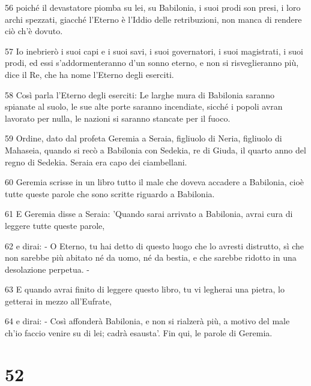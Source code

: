 \par 56 poiché il devastatore piomba su lei, su Babilonia, i suoi prodi son presi, i loro archi spezzati, giacché l'Eterno è l'Iddio delle retribuzioni, non manca di rendere ciò ch'è dovuto.
\par 57 Io inebrierò i suoi capi e i suoi savi, i suoi governatori, i suoi magistrati, i suoi prodi, ed essi s'addormenteranno d'un sonno eterno, e non si risveglieranno più, dice il Re, che ha nome l'Eterno degli eserciti.
\par 58 Così parla l'Eterno degli eserciti: Le larghe mura di Babilonia saranno spianate al suolo, le sue alte porte saranno incendiate, sicché i popoli avran lavorato per nulla, le nazioni si saranno stancate per il fuoco.
\par 59 Ordine, dato dal profeta Geremia a Seraia, figliuolo di Neria, figliuolo di Mahaseia, quando si recò a Babilonia con Sedekia, re di Giuda, il quarto anno del regno di Sedekia. Seraia era capo dei ciambellani.
\par 60 Geremia scrisse in un libro tutto il male che doveva accadere a Babilonia, cioè tutte queste parole che sono scritte riguardo a Babilonia.
\par 61 E Geremia disse a Seraia: 'Quando sarai arrivato a Babilonia, avrai cura di leggere tutte queste parole,
\par 62 e dirai: - O Eterno, tu hai detto di questo luogo che lo avresti distrutto, sì che non sarebbe più abitato né da uomo, né da bestia, e che sarebbe ridotto in una desolazione perpetua. -
\par 63 E quando avrai finito di leggere questo libro, tu vi legherai una pietra, lo getterai in mezzo all'Eufrate,
\par 64 e dirai: - Così affonderà Babilonia, e non si rialzerà più, a motivo del male ch'io faccio venire su di lei; cadrà esausta'. Fin qui, le parole di Geremia.

\chapter{52}


